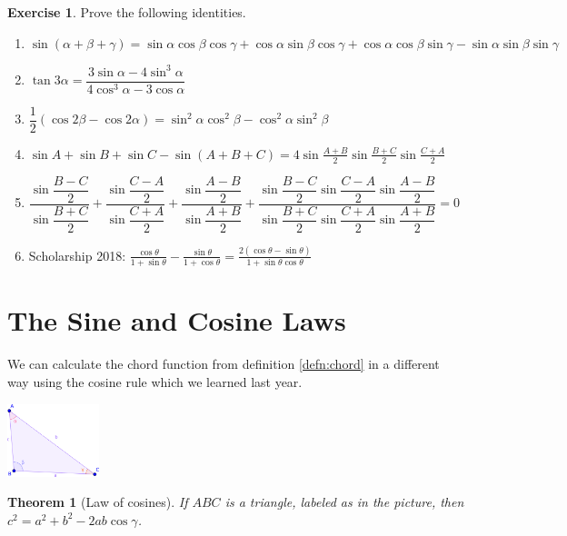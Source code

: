 \documentclass[a4paper,leqno]{article}
\numberwithin{equation}{section}
\newtheorem{thm}[equation]{Theorem}
\theoremstyle{definition}
\newtheorem{exercise}[equation]{Exercise}
\theoremstyle{remark}
\begin{document}
\begin{exercise}
  Prove the following identities.
  \begin{enumerate}
    \item $ \sin(\alpha + \beta + \gamma) = \sin\alpha \cos\beta \cos\gamma + \cos\alpha\sin\beta\cos\gamma + \cos\alpha\cos\beta\sin\gamma - \sin\alpha\sin\beta\sin\gamma $
    \item $ \tan 3\alpha = \dfrac{3\sin\alpha - 4\sin^3 \alpha}{4\cos^3 \alpha - 3\cos\alpha} $
    \item $ \dfrac{1}{2}(\cos 2\beta - \cos 2\alpha) = \sin^2 \alpha \cos^2\beta - \cos^2\alpha \sin^2 \beta $
    \item $ \sin A + \sin B + \sin C - \sin (A + B + C) = 4\sin \frac{A + B}{2}\sin \frac{B + C}{2}\sin \frac{C + A}{2} $
    \item $ \dfrac{\sin \dfrac{B - C}{2}}{\sin \dfrac{B + C}{2}} + \dfrac{\sin \dfrac{C - A}{2}}{\sin \dfrac{C + A}{2}} + \dfrac{\sin \dfrac{A - B}{2}}{\sin \dfrac{A + B}{2}} + \dfrac{\sin \dfrac{B - C}{2}\sin \dfrac{C - A}{2}\sin \dfrac{A - B}{2}}{\sin \dfrac{B + C}{2}\sin \dfrac{C + A}{2}\sin \dfrac{A + B}{2}} = 0 $
    \item Scholarship 2018: $ \frac{\cos \theta}{1 + \sin \theta} - \frac{\sin \theta}{1 + \cos\theta} = \frac{2(\cos\theta - \sin\theta)}{1+ \sin\theta \cos \theta} $
  \end{enumerate}
\end{exercise}

\section{The Sine and Cosine Laws}
We can calculate the chord function from definition \ref{defn:chord} in a different way using the cosine rule which we learned last year.

\begin{center}
  \includegraphics[width=0.2\textwidth]{trisines}
\end{center}

\begin{thm}[Law of cosines]
  If $ ABC $ is a triangle, labeled as in the picture, then $ c^2 = a^2 + b^2 - 2ab \cos \gamma $.
\end{thm}
\end{document}
